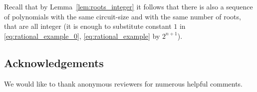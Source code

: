 \documentclass[11pt]{article}
\begin{document}
Recall that by Lemma~\ref{lem:roots_integer} it follows that there is also a sequence of polynomials with the same circuit-size and with the same number of roots, that are all integer (it is enough to substitute constant $1$ in \eqref{eq:rational_example_0}, \eqref{eq:rational_example} by $2^{n+1}$).


\subsection*{Acknowledgements} %


We would like to thank anonymous reviewers for numerous helpful comments.

{\small


}
\end{document}
